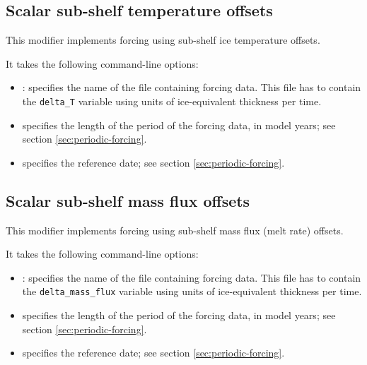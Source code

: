 \documentclass[titlepage,letterpaper,final]{scrartcl}
\begin{document}
\subsection{Scalar sub-shelf temperature offsets}
\label{sec:delta-subshelf-temp}

This modifier implements forcing using sub-shelf ice temperature offsets.

It takes the following command-line options:
\begin{itemize}
\item {}: specifies the name of the file containing forcing data. This file has to contain the \texttt{delta_T} variable using units of ice-equivalent thickness per time.
\item {} specifies the length of the period of the forcing data, in model years; see section \ref{sec:periodic-forcing}.
\item {} specifies the reference date; see section \ref{sec:periodic-forcing}.
\end{itemize}

\subsection{Scalar sub-shelf mass flux offsets}
\label{sec:delta-subshelf-smb}

This modifier implements forcing using sub-shelf mass flux (melt rate) offsets.

It takes the following command-line options:
\begin{itemize}
\item {}: specifies the name of the file containing forcing data. This file has to contain the \texttt{delta_mass_flux} variable using units of ice-equivalent thickness per time.
\item {} specifies the length of the period of the forcing data, in model years; see section \ref{sec:periodic-forcing}.
\item {} specifies the reference date; see section \ref{sec:periodic-forcing}.
\end{itemize}


\clearpage\newpage



{}
\label{sect:index}
{\small \printindex }

{}
{ \small \printindex[options] }
\end{document}
